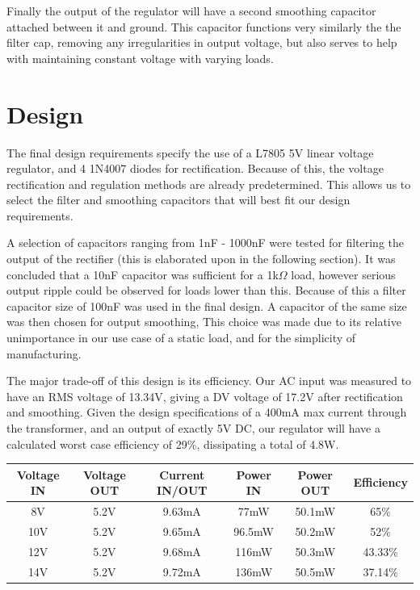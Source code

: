 \documentclass[a4paper,11pt]{article}
\begin{document}
Finally the output of the regulator will have a second smoothing capacitor attached between it and ground. This capacitor functions very similarly the the filter cap, removing any irregularities in output voltage, but also serves to help with maintaining constant voltage with varying loads.

\section{Design}

The final design requirements specify the use of a L7805 5V linear voltage regulator, and 4 1N4007 diodes for rectification. Because of this, the voltage rectification and regulation methods are already predetermined. This allows us to select the filter and smoothing capacitors that will best fit our design requirements.
 
A selection of capacitors ranging from 1nF - 1000nF were tested for filtering the output of the rectifier (this is elaborated upon in the following section). It was concluded that a 10nF capacitor was sufficient for a 1k$\Omega$ load, however serious output ripple could be observed for loads lower than this. Because of this a filter capacitor size of 100nF was used in the final design. A capacitor of the same size was then chosen for output smoothing, This choice was made due to its relative unimportance in our use case of a static load, and for the simplicity of manufacturing. 

The major trade-off of this design is its efficiency. Our AC input was measured to have an RMS voltage of 13.34V, giving a DV voltage of 17.2V after rectification and smoothing. Given the design specifications of a 400mA max current through the transformer, and an output of exactly 5V DC, our regulator will have a calculated worst case efficiency of 29\%, dissipating a total of 4.8W. 

\begin{center}
\begin{tabular}{|c|c|c|c|c|c|}  
\hline
Voltage IN & Voltage OUT & Current IN/OUT & Power IN & Power OUT & Efficiency\\
\hline
8V & 5.2V & 9.63mA & 77mW & 50.1mW & 65\%\\
10V & 5.2V & 9.65mA & 96.5mW & 50.2mW & 52\%\\
12V & 5.2V & 9.68mA & 116mW & 50.3mW & 43.33\%\\
14V & 5.2V & 9.72mA & 136mW & 50.5mW & 37.14\%\\
\hline
\end{tabular}
\end{center}
\end{document}
